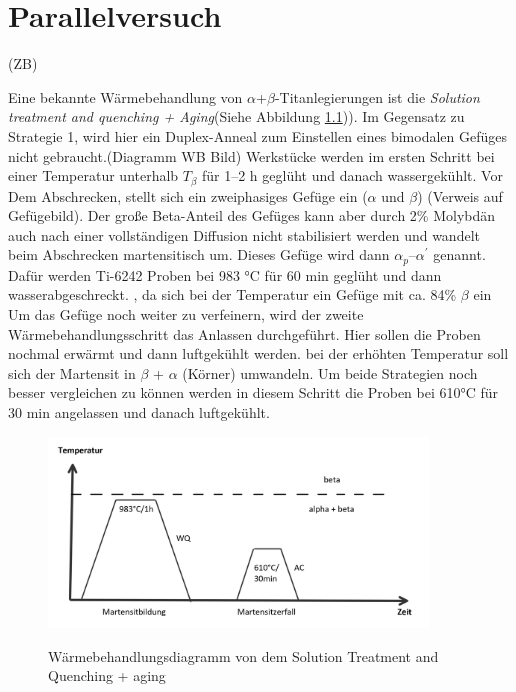\chapter{Parallelversuch}

(ZB)

Eine bekannte Wärmebehandlung von $\alpha$+$\beta$-Titanlegierungen ist die  \textit{Solution treatment and quenching + Aging}(Siehe Abbildung \ref{fig:SQ})). Im Gegensatz zu  Strategie 1, wird hier ein Duplex-Anneal zum Einstellen eines bimodalen Gefüges nicht gebraucht.(Diagramm WB Bild)  Werkstücke werden im ersten Schritt bei einer Temperatur unterhalb $T_{\beta}$ für 1--2 h geglüht und danach wassergekühlt. Vor Dem Abschrecken, stellt sich ein zweiphasiges Gefüge ein ($\alpha$ und $\beta$) (Verweis auf Gefügebild). Der große Beta-Anteil des Gefüges kann aber durch 2\% Molybdän auch nach einer vollständigen Diffusion nicht stabilisiert werden und wandelt beim Abschrecken martensitisch um. Dieses Gefüge wird dann $\alpha_p$--$\alpha^\prime$ genannt.
Dafür werden Ti-6242 Proben bei 983 °C für 60 min geglüht und dann wasserabgeschreckt. , da sich bei der Temperatur ein Gefüge mit ca. 84\% $\beta$ ein
Um das Gefüge noch weiter zu verfeinern, wird der zweite Wärmebehandlungsschritt das Anlassen durchgeführt. Hier sollen die Proben nochmal erwärmt  und dann luftgekühlt werden. bei der erhöhten Temperatur soll sich der Martensit in $\beta$ + $\alpha$ (Körner) umwandeln.
Um beide Strategien noch besser vergleichen zu können werden in diesem Schritt  die Proben bei  610°C  für 30 min angelassen und danach luftgekühlt.

\begin{figure}[H]
	\centering
	
	{\includegraphics[width=0.9\textwidth]{Bilder/SQ}}
	\caption{Wärmebehandlungsdiagramm von dem Solution Treatment and Quenching + aging}
	\label{fig:SQ}
\end{figure}

